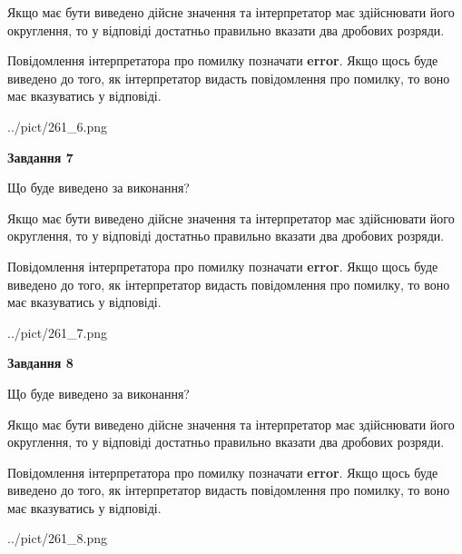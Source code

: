 \documentclass[12pt, ukrainian]{article}
\begin{document}
{\begin {Large}
Якщо має бути виведено дійсне значення та інтерпретатор має здійснювати його округлення, 
то у відповіді достатньо правильно вказати два дробових розряди.

Повідомлення інтерпретатора про помилку позначати \textbf{error}.
Якщо щось буде виведено до того, як інтерпретатор видасть повідомлення про помилку, 
то воно має вказуватись у відповіді. \par

\begin{center}
	{../pict/261_6.png}
\end{center}
\newpage

{\begin {center}\textbf{Завдання 7}\end {center}}\par
Що буде виведено за виконання? \par

Якщо має бути виведено дійсне значення та інтерпретатор має здійснювати його округлення, 
то у відповіді достатньо правильно вказати два дробових розряди.

Повідомлення інтерпретатора про помилку позначати \textbf{error}.
Якщо щось буде виведено до того, як інтерпретатор видасть повідомлення про помилку, 
то воно має вказуватись у відповіді. \par

\begin{center}
	{../pict/261_7.png}
\end{center}
\newpage

{\begin {center}\textbf{Завдання 8}\end {center}}\par
Що буде виведено за виконання? \par

Якщо має бути виведено дійсне значення та інтерпретатор має здійснювати його округлення, 
то у відповіді достатньо правильно вказати два дробових розряди.

Повідомлення інтерпретатора про помилку позначати \textbf{error}.
Якщо щось буде виведено до того, як інтерпретатор видасть повідомлення про помилку, 
то воно має вказуватись у відповіді. \par

\begin{center}
	{../pict/261_8.png}
\end{center}
\newpage


\end{Large}}
\end{document}
